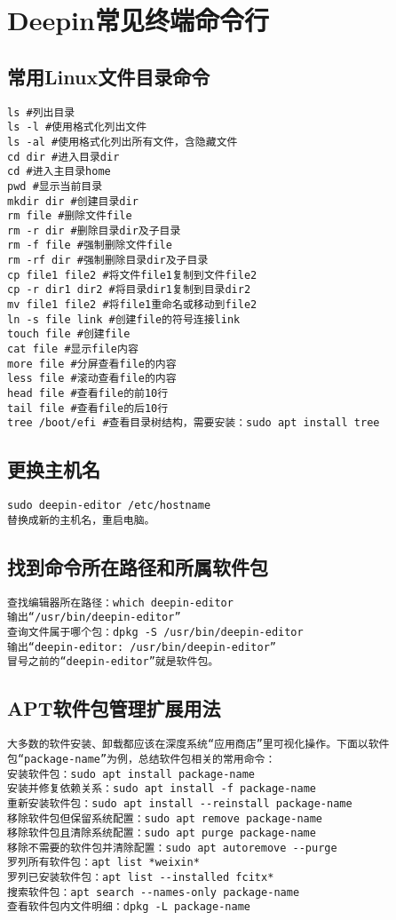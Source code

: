\documentclass[a4paper,fontset=fandol,zihao=-4,linespread=1.2,oneside]{ctexbook}
\begin{document}
\chapter{Deepin常见终端命令行}

\section{常用Linux文件目录命令}
\begin{lstlisting}
ls #列出目录
ls -l #使用格式化列出文件
ls -al #使用格式化列出所有文件，含隐藏文件
cd dir #进入目录dir
cd #进入主目录home
pwd #显示当前目录
mkdir dir #创建目录dir
rm file #删除文件file
rm -r dir #删除目录dir及子目录
rm -f file #强制删除文件file
rm -rf dir #强制删除目录dir及子目录
cp file1 file2 #将文件file1复制到文件file2
cp -r dir1 dir2 #将目录dir1复制到目录dir2
mv file1 file2 #将file1重命名或移动到file2
ln -s file link #创建file的符号连接link
touch file #创建file
cat file #显示file内容
more file #分屏查看file的内容
less file #滚动查看file的内容
head file #查看file的前10行
tail file #查看file的后10行
tree /boot/efi #查看目录树结构，需要安装：sudo apt install tree
\end{lstlisting}

\section{更换主机名}
\begin{lstlisting}
sudo deepin-editor /etc/hostname
替换成新的主机名，重启电脑。
\end{lstlisting}

\section{找到命令所在路径和所属软件包}
\begin{lstlisting}
查找编辑器所在路径：which deepin-editor
输出“/usr/bin/deepin-editor”
查询文件属于哪个包：dpkg -S /usr/bin/deepin-editor
输出“deepin-editor: /usr/bin/deepin-editor”
冒号之前的“deepin-editor”就是软件包。
\end{lstlisting}

\section{APT软件包管理扩展用法}
\begin{lstlisting}
大多数的软件安装、卸载都应该在深度系统“应用商店”里可视化操作。下面以软件包“package-name”为例，总结软件包相关的常用命令：
安装软件包：sudo apt install package-name
安装并修复依赖关系：sudo apt install -f package-name
重新安装软件包：sudo apt install --reinstall package-name
移除软件包但保留系统配置：sudo apt remove package-name
移除软件包且清除系统配置：sudo apt purge package-name
移除不需要的软件包并清除配置：sudo apt autoremove --purge
罗列所有软件包：apt list *weixin*
罗列已安装软件包：apt list --installed fcitx*
搜索软件包：apt search --names-only package-name
查看软件包内文件明细：dpkg -L package-name
\end{lstlisting}
\end{document}

